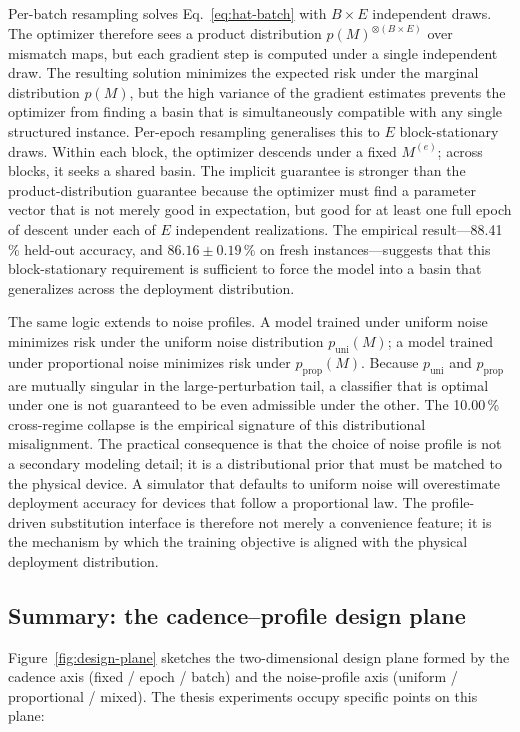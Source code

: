 Per-batch resampling solves Eq.~\ref{eq:hat-batch} with $B\times E$ independent draws. The optimizer therefore sees a product distribution $p(M)^{\otimes(B\times E)}$ over mismatch maps, but each gradient step is computed under a single independent draw. The resulting solution minimizes the expected risk under the marginal distribution $p(M)$, but the high variance of the gradient estimates prevents the optimizer from finding a basin that is simultaneously compatible with any single structured instance.  Per-epoch resampling generalises this to $E$ block-stationary draws. Within each block, the optimizer descends under a fixed $M^{(e)}$; across blocks, it seeks a shared basin. The implicit guarantee is stronger than the product-distribution guarantee because the optimizer must find a parameter vector that is not merely good in expectation, but good for at least one full epoch of descent under each of $E$ independent realizations. The empirical result---88.41\,\% held-out accuracy, and $86.16\pm0.19\,\%$ on fresh instances---suggests that this block-stationary requirement is sufficient to force the model into a basin that generalizes across the deployment distribution.

The same logic extends to noise profiles. A model trained under uniform noise minimizes risk under the uniform noise distribution $p_{\mathrm{uni}}(M)$; a model trained under proportional noise minimizes risk under $p_{\mathrm{prop}}(M)$. Because $p_{\mathrm{uni}}$ and $p_{\mathrm{prop}}$ are mutually singular in the large-perturbation tail, a classifier that is optimal under one is not guaranteed to be even admissible under the other. The 10.00\,\% cross-regime collapse is the empirical signature of this distributional misalignment.  The practical consequence is that the choice of noise profile is not a secondary modeling detail; it is a distributional prior that must be matched to the physical device. A simulator that defaults to uniform noise will overestimate deployment accuracy for devices that follow a proportional law. The profile-driven substitution interface is therefore not merely a convenience feature; it is the mechanism by which the training objective is aligned with the physical deployment distribution.

\subsection{Summary: the cadence--profile design plane}

Figure~\ref{fig:design-plane} sketches the two-dimensional design plane formed by the cadence axis (fixed / epoch / batch) and the noise-profile axis (uniform / proportional / mixed). The thesis experiments occupy specific points on this plane:

